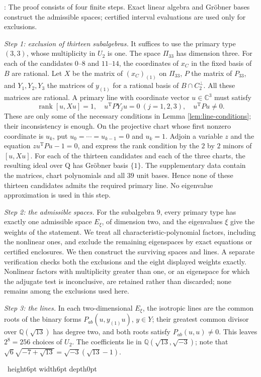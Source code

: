 \documentclass[leqno]{article}
\newcommand{\Cbb}{\ensuremath{\mathbb{C}}}
\newcommand{\Q}{\mathrm{Q}}
\newcommand{\qed}{\hfill \vrule height6pt  width6pt depth0pt}
\newenvironment{proof}[1][]{\noindent {\it Proof #1} : }{\hbox{~}\qed
\smallskip
}
\numberwithin{equation}{section}
\begin{document}
\begin{proof}
The proof consists of four finite steps. Exact linear algebra and Gröbner bases construct the admissible spaces; certified interval evaluations are used only for exclusions.

\emph{Step 1: exclusion of thirteen subalgebras.} It suffices to use the primary type $(3,3)$, whose multiplicity in $U_2$ is one. The space $\Pi_{33}$ has dimension three. For each of the candidates $0$--$8$ and $11$--$14$, the coordinates of $x_C$ in the fixed basis of $B$ are rational. Let $X$ be the matrix of $(x_C)_{(1)}$ on $\Pi_{33}$, $P$ the matrix of $P_{33}$, and $Y_1,Y_2,Y_3$ the matrices of $y_{(1)}$ for a rational basis of $B \cap C_2^\perp$. All these matrices are rational. A primary line with coordinate vector $u \in \Cbb^3$ must satisfy
\[
\operatorname{rank}[u,Xu] = 1, \quad u^{\mathrm T} P Y_j u = 0 \ (j = 1,2,3), \quad u^{\mathrm T}Pu \neq 0.
\]
These are only some of the necessary conditions in Lemma \ref{lem:line-conditions}; their inconsistency is enough. On the projective chart whose first nonzero coordinate is $u_k$, put $u_0 = \cdots = u_{k-1} = 0$ and $u_k = 1$. Adjoin a variable $z$ and the equation $z u^{\mathrm T}Pu-1 = 0$, and express the rank condition by the $2$ by $2$ minors of $[u,Xu]$. For each of the thirteen candidates and each of the three charts, the resulting ideal over $\Q$ has Gröbner basis $\{1\}$. The supplementary data contain the matrices, chart polynomials and all $39$ unit bases. Hence none of these thirteen candidates admits the required primary line. No eigenvalue approximation is used in this step.

\emph{Step 2: the admissible spaces.} For the subalgebra $9$, every primary type has exactly one admissible space $E_\xi$, of dimension two, and the eigenvalues $\xi$ give the weights of the statement. We treat all characteristic-polynomial factors, including the nonlinear ones, and exclude the remaining eigenspaces by exact equations or certified enclosures. We then construct the surviving spaces and lines. A separate verification checks both the exclusions and the eight displayed weights exactly. Nonlinear factors with multiplicity greater than one, or an eigenspace for which the adjugate test is inconclusive, are retained rather than discarded; none remains among the exclusions used here.

\emph{Step 3: the lines.} In each two-dimensional $E_\xi$, the isotropic lines are the common roots of the binary forms $P_{ab}(u,y_{(1)}u)$, $y \in Y$; their greatest common divisor over $\mathbb{Q}(\sqrt{13})$ has degree two, and both roots satisfy $P_{ab}(u,u) \neq 0$. This leaves $2^8 = 256$ choices of $U_2$. The coefficients lie in $\mathbb{Q}(\sqrt{13},\sqrt{-3})$; note that $\sqrt 6\sqrt{-7+\sqrt{13}} = \sqrt{-3}(\sqrt{13}-1)$.


\end{proof}
\end{document}
